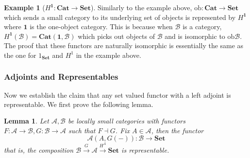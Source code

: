 \documentclass[11pt]{article}
\theoremstyle{definition}
\theoremstyle{definition}
\newtheorem{ex}{Example}
\theoremstyle{plain}
\theoremstyle{plain}
\theoremstyle{plain}
\newtheorem{lem}{Lemma}
\begin{document}
\begin{ex}[$H^{\textbf{1}}:\textbf{Cat} \to \textbf{Set}$]
Similarly to the example above, $\text{ob}:\textbf{Cat} \to \textbf{Set}$ which sends a small category to its underlying set of objects is represented by $H^{\textbf{1}}$ where $\textbf{1}$ is the one-object category. This is because when $\mathscr{B}$ is a category, $H^{\textbf{1}}(\mathscr{B}) = \textbf{Cat}(\textbf{1}, \mathscr{B})$ which picks out objects of $\mathscr{B}$ and is isomorphic to $\text{ob}\mathscr{B}$. The proof that these functors are naturally isomorphic is essentially the same as the one for $1_{\textbf{Set}}$ and $H^{1}$ in the example above.
\end{ex}

\subsubsection*{Adjoints and Representables}

Now we establish the claim that any set valued functor with a left adjoint is representable. We first prove the following lemma.

\begin{lem}
Let $\mathscr{A}, \mathscr{B}$ be locally small categories with functors $F:\mathscr{A} \to \mathscr{B}, G:\mathscr{B} \to \mathscr{A}$ such that $F \dashv G$. Fix $A \in \mathscr{A}$, then the functor \begin{equation*} \mathscr{A}(A, G(-)): \mathscr{B} \to \textbf{Set} \end{equation*} that is, the composition $\mathscr{B} \overset{G}{\to} \mathscr{A} \overset{H^{A}}{\to} \textbf{Set}$ is representable.
\end{lem}
\end{document}
